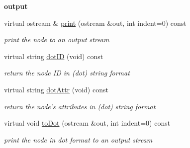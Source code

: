 \begin{Indent}{\bf output}\par
\begin{DoxyCompactItemize}
\item 
virtual ostream \& \hyperlink{classCCodeBlock_ad8d30b8335f9ddacd66ce437930b22d0}{print} (ostream \&out, int indent=0) const 
\begin{DoxyCompactList}\small\item\em print the node to an output stream \end{DoxyCompactList}\item 
virtual string \hyperlink{classCCodeBlock_ad354e5701fe2f3c3670da03fac7dd67e}{dot\-I\-D} (void) const 
\begin{DoxyCompactList}\small\item\em return the node I\-D in (dot) string format \end{DoxyCompactList}\item 
virtual string \hyperlink{classCCodeBlock_a4d94deb040c2329b61747f55b9e7f136}{dot\-Attr} (void) const 
\begin{DoxyCompactList}\small\item\em return the node's attributes in (dot) string format \end{DoxyCompactList}\item 
virtual void \hyperlink{classCCodeBlock_a8c325d792f9d91d218312730695dc35b}{to\-Dot} (ostream \&out, int indent=0) const 
\begin{DoxyCompactList}\small\item\em print the node in dot format to an output stream \end{DoxyCompactList}\end{DoxyCompactItemize}
\end{Indent}
